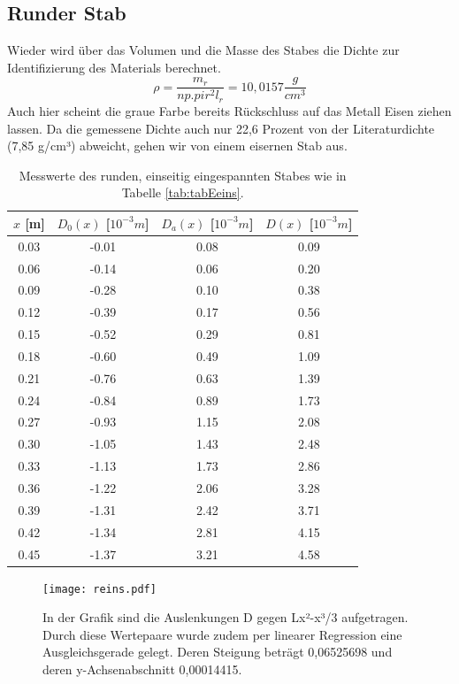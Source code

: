 \documentclass[titlepage = firstcover]{scrartcl}
\begin{document}
      \subsection{Runder Stab}
      \begin{table}[h]
        \centering
        Wieder wird über das Volumen und die Masse des Stabes die Dichte zur Identifizierung des Materials berechnet.
        \begin{equation*}
          \rho = \frac{m_r}{np.pi r^2 l_r} = 10,0157 \frac{g}{cm^3}
        \end{equation*}
        Auch hier scheint die graue Farbe bereits Rückschluss auf das Metall Eisen ziehen lassen. Da die gemessene Dichte auch nur 22,6 Prozent von der 
        Literaturdichte (7,85 g/cm³) abweicht, gehen wir von einem eisernen Stab aus. 
        \caption{Messwerte des runden, einseitig eingespannten Stabes wie in Tabelle \ref{tab:tabEeins}.}
        \label{tab:tabReins}
        \begin{tabular}{c c c c}
          \toprule
          {$x$ [m]} & {$D_0(x)$ [$10^{-3}m$]} & {$D_a(x)$ [$10^{-3}m$]} & {$D(x)$ [$10^{-3}m$]}\\
          \midrule
          0.03 &-0.01 & 0.08 & 0.09\\
          0.06 &-0.14 & 0.06 & 0.20\\
          0.09 &-0.28 & 0.10 & 0.38\\
          0.12 &-0.39 & 0.17 & 0.56\\
          0.15 &-0.52 & 0.29 & 0.81\\
          0.18 &-0.60 & 0.49 & 1.09\\
          0.21 &-0.76 & 0.63 & 1.39\\
          0.24 &-0.84 & 0.89 & 1.73\\
          0.27 &-0.93 & 1.15 & 2.08\\
          0.30 &-1.05 & 1.43 & 2.48\\
          0.33 &-1.13 & 1.73 & 2.86\\
          0.36 &-1.22 & 2.06 & 3.28\\
          0.39 &-1.31 & 2.42 & 3.71\\
          0.42 &-1.34 & 2.81 & 4.15\\
          0.45 &-1.37 & 3.21 & 4.58\\
          \bottomrule            
        \end{tabular}
      \end{table}
    
      \begin{figure}
        \centering
        \texttt{[image: reins.pdf]}
        \caption{In der Grafik sind die Auslenkungen D gegen Lx²-x³/3 aufgetragen. Durch diese Wertepaare wurde zudem per linearer Regression eine Ausgleichsgerade gelegt. Deren Steigung beträgt 0,06525698 und deren y-Achsenabschnitt 0,00014415.}
        \label{fig:graphReins}
      \end{figure}
\end{document}
